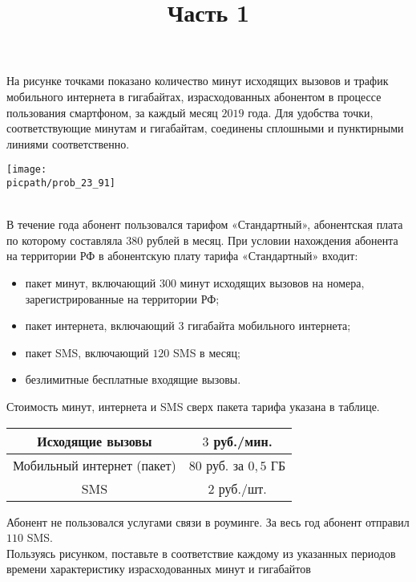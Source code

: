 \begin{training}[2]
	\title{Часть 1}
	\begin{listofex}
		\item
		На рисунке точками показано количество минут исходящих вызовов и трафик мобильного интернета в гигабайтах, израсходованных абонентом в процессе пользования смартфоном, за каждый месяц \(2019\) года. Для удобства точки, соответствующие минутам и гигабайтам, соединены сплошными и пунктирными линиями соответственно.
			\foranswer
		\gapwidth
		\begin{center}
			\texttt{[image: \\picpath/prob\_23\_91]}
		\end{center}\\
		В течение года абонент пользовался тарифом «Стандартный», абонентская плата по которому составляла \(380\) рублей в месяц. При условии нахождения абонента на территории РФ в абонентскую плату тарифа «Стандартный» входит:
		\begin{itemize}
			\item пакет минут, включающий \(300\) минут исходящих вызовов на номера, 	зарегистрированные на территории РФ;
			\item пакет интернета, включающий \(3\) гигабайта мобильного интернета;
			\item пакет SMS, включающий \(120\) SMS в месяц;
			\item безлимитные бесплатные входящие вызовы.
		\end{itemize}
		Стоимость минут, интернета и SMS сверх пакета тарифа указана в таблице.
		\begin{center}
			\begin{tabular}{ |c|c| }
				\hline
				Исходящие вызовы & \(3\) руб./мин. \\ 
				\hline
				Мобильный интернет (пакет) & \(80\) руб. за \(0,5\) ГБ \\
				\hline
				SMS & \(2\) руб./шт. \\
				\hline
			\end{tabular}
		\end{center}
		Абонент не пользовался услугами связи в роуминге. За весь год абонент отправил \(110\) SMS.\\
		 Пользуясь рисунком, поставьте в соответствие каждому из указанных периодов времени характеристику израсходованных минут и гигабайтов
		\begin{center}
			\begin{tabular}{ |p{1.7in}|p{2.8in}| }

\end{tabular}
\end{center}
\end{listofex}
\end{training}
